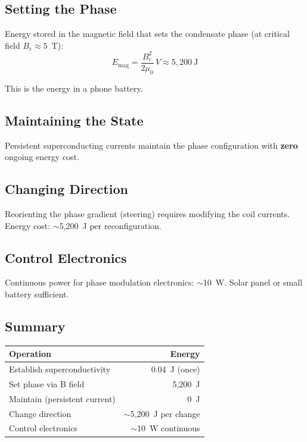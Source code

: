 \documentclass[11pt, a4paper]{article}
\begin{document}
\subsection{Setting the Phase}

Energy stored in the magnetic field that sets the condensate
phase (at critical field $B_c \approx 5$~T):
\begin{equation}
  E_{\text{mag}} = \frac{B_c^2}{2\mu_0}\,V
  \approx 5{,}200~\text{J}
\end{equation}

This is the energy in a phone battery.

\subsection{Maintaining the State}

Persistent superconducting currents maintain the phase
configuration with \textbf{zero} ongoing energy cost.

\subsection{Changing Direction}

Reorienting the phase gradient (steering) requires modifying
the coil currents. Energy cost: $\sim$5{,}200~J per
reconfiguration.

\subsection{Control Electronics}

Continuous power for phase modulation electronics: $\sim$10~W.
Solar panel or small battery sufficient.

\subsection{Summary}

\begin{center}
\begin{tabular}{@{}lr@{}}
\toprule
\textbf{Operation} & \textbf{Energy} \\
\midrule
Establish superconductivity & 0.04~J (once) \\
Set phase via B field & 5{,}200~J \\
Maintain (persistent current) & 0~J \\
Change direction & $\sim$5{,}200~J per change \\
Control electronics & $\sim$10~W continuous \\
\bottomrule
\end{tabular}
\end{center}
\end{document}
